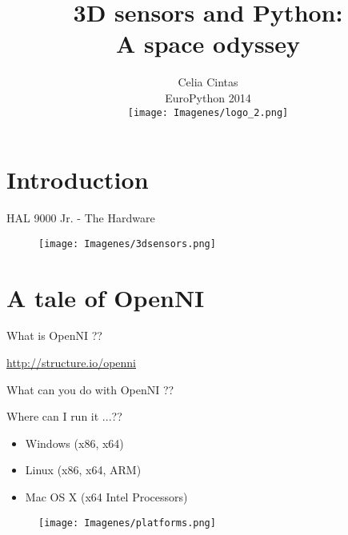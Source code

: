 \documentclass[bigger]{beamer}
\begin{document}
\normalfont\ECFAugie

\title{3D sensors and Python:\\ A space odyssey \\[0.5cm]}
\subtitle{Celia Cintas \\[0.2cm] EuroPython 2014 \\[0.3cm]
\texttt{[image: Imagenes/logo\_2.png]}}
\date{}
\begin{frame}
\titlepage
\end{frame}
\section{Introduction}


\begin{frame}[t]{\ECFAugie HAL 9000 Jr. - The Hardware}
\begin{figure}
		\texttt{[image: Imagenes/3dsensors.png]}
\end{figure}
\end{frame}

\section{A tale of OpenNI}
\begin{frame}[fragile]{\ECFAugie What is OpenNI ??}
\begin{center}
\url{http://structure.io/openni}
\end{center}
\end{frame}

\begin{frame}{\ECFAugie What can you do with OpenNI ??}
\end{frame}

\begin{frame}{\ECFAugie Where can I run it ...??}
\begin{minipage}{0.47\textwidth}
\begin{itemize}
	\item Windows (x86, x64)
	\item Linux (x86, x64, ARM)
	\item Mac OS X (x64 Intel Processors)
\end{itemize}
\end{minipage}
\begin{minipage}{0.5\textwidth}
\begin{figure}[h]
		\texttt{[image: Imagenes/platforms.png]}
\end{figure}
\end{minipage}
\end{frame}
\end{document}
